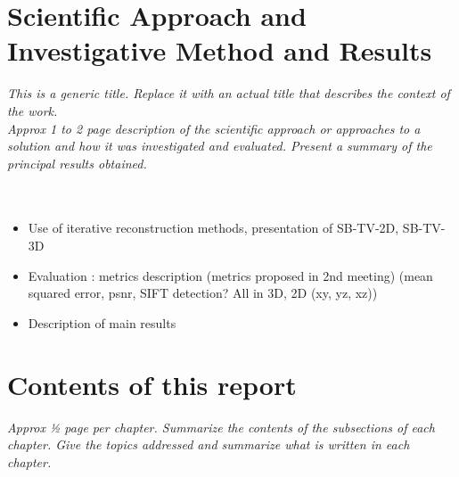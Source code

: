 \section{Scientific Approach and Investigative Method and Results}
\textit{This is a generic title. Replace it with an actual title that describes the context of the work.\\
Approx  1 to 2  page description of the scientific approach or approaches to a solution and how it was   investigated and evaluated.  Present a summary of the principal results obtained.} \\
\\
\\
\begin{itemize}
	\item 	Use of iterative reconstruction methods, presentation of SB-TV-2D, SB-TV-3D
	\item 	Evaluation : metrics description (metrics proposed in 2nd meeting) (mean squared error, psnr, SIFT detection? All in 3D, 2D (xy, yz, xz))
	\item 	Description of main results
\end{itemize}

\section{Contents of this report}

\textit{Approx ½ page per chapter.  Summarize the contents of the subsections of each chapter. Give the topics addressed and summarize what is written in each chapter.}
